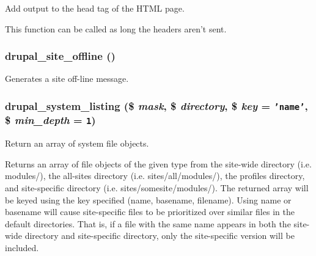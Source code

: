 Add output to the head tag of the HTML page.

This function can be called as long the headers aren't sent. \hypertarget{common_8inc_fc3a1915f45be2ac8666778eef0e9758}{
\subsubsection[{drupal\_\-site\_\-offline}]{\setlength{\rightskip}{0pt plus 5cm}drupal\_\-site\_\-offline ()}}
\label{common_8inc_fc3a1915f45be2ac8666778eef0e9758}


Generates a site off-line message. \hypertarget{common_8inc_60d1237b23d4e84a59656003596add4b}{
\subsubsection[{drupal\_\-system\_\-listing}]{\setlength{\rightskip}{0pt plus 5cm}drupal\_\-system\_\-listing (\$ {\em mask}, \/  \$ {\em directory}, \/  \$ {\em key} = {\tt 'name'}, \/  \$ {\em min\_\-depth} = {\tt 1})}}
\label{common_8inc_60d1237b23d4e84a59656003596add4b}


Return an array of system file objects.

Returns an array of file objects of the given type from the site-wide directory (i.e. modules/), the all-sites directory (i.e. sites/all/modules/), the profiles directory, and site-specific directory (i.e. sites/somesite/modules/). The returned array will be keyed using the key specified (name, basename, filename). Using name or basename will cause site-specific files to be prioritized over similar files in the default directories. That is, if a file with the same name appears in both the site-wide directory and site-specific directory, only the site-specific version will be included.


